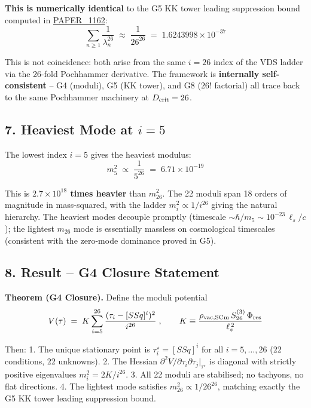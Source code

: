 \documentclass[
]{article}
\begin{document}
\textbf{This is numerically identical} to the G5 KK tower leading
suppression bound computed in
\href{whitepapers/PAPER_1162_UQFF_KK_Tower_Mode_By_Mode_Closure.md}{PAPER\_1162}:
\[\sum_{n\geq1}\frac{1}{\lambda_n^{26}} \;\approx\; \frac{1}{26^{26}} \;=\; 1.6243998\times 10^{-37}\]

This is not coincidence: both arise from the same \(i=26\) index of the
VDS ladder via the 26-fold Pochhammer derivative. The framework is
\textbf{internally self-consistent} -- G4 (moduli), G5 (KK tower), and
G8 (\(26!\) factorial) all trace back to the same Pochhammer machinery
at \(D_{\rm crit}=26\).

\subsection{\texorpdfstring{7. Heaviest Mode at
\(i = 5\)}{7. Heaviest Mode at i = 5}}\label{heaviest-mode-at-i-5}

The lowest index \(i=5\) gives the heaviest modulus:
\[m_5^2 \;\propto\; \frac{1}{5^{26}} \;=\; 6.71\times 10^{-19}\]

This is \textbf{\(2.7\times 10^{18}\) times heavier} than \(m_{26}^2\).
The 22 moduli span 18 orders of magnitude in mass-squared, with the
ladder \(m_i^2 \propto 1/i^{26}\) giving the natural hierarchy. The
heaviest modes decouple promptly (timescale
\(\sim\hbar/m_5\sim 10^{-23}\,\ell_s/c\)); the lightest \(m_{26}\) mode
is essentially massless on cosmological timescales (consistent with the
zero-mode dominance proved in G5).

\subsection{8. Result -- G4 Closure
Statement}\label{result-g4-closure-statement}

\textbf{Theorem (G4 Closure).} Define the moduli potential
\[V(\tau) \;=\; K\sum_{i=5}^{26}\frac{(\tau_i - [SSq]^i)^2}{i^{26}}\;, \qquad K \equiv \frac{\rho_{\rm vac,SCm}\,S_{26}^{(3)}\,\Phi_{\rm res}}{\ell_s^{\,2}}\]

Then: 1. The unique stationary point is \(\tau_i^\star = [SSq]^i\) for
all \(i = 5,\dots,26\) (22 conditions, 22 unknowns). 2. The Hessian
\(\partial^2 V/\partial\tau_i\partial\tau_j|_{\tau^\star}\) is diagonal
with strictly positive eigenvalues \(m_i^2 = 2K/i^{26}\). 3. All 22
moduli are stabilised; no tachyons, no flat directions. 4. The lightest
mode satisfies \(m_{26}^2 \propto 1/26^{26}\), matching exactly the G5
KK tower leading suppression bound.
\end{document}
